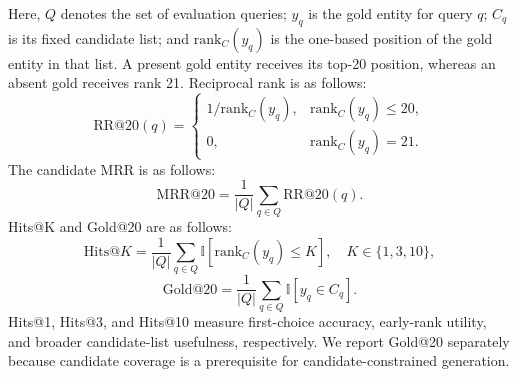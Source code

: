 \documentclass[pdflatex,sn-mathphys-num]{sn-jnl}
\begin{document}
Here, $Q$ denotes the set of evaluation queries; $y_q$ is the gold entity for query $q$; $C_q$ is its fixed candidate list; and $\mathrm{rank}_C(y_q)$ is the one-based position of the gold entity in that list. A present gold entity receives its top-20 position, whereas an absent gold receives rank 21. Reciprocal rank is  as follows:
\begin{equation}
\mathrm{RR@20}(q)=
\begin{cases}
1/\mathrm{rank}_C(y_q), & \mathrm{rank}_C(y_q)\leq20,\\
0, & \mathrm{rank}_C(y_q)=21.
\end{cases}
\label{eq:rr}
\end{equation}
The candidate MRR is  as follows:
\begin{equation}
\mathrm{MRR@20}=\frac{1}{|Q|}\sum_{q\in Q}\mathrm{RR@20}(q).
\label{eq:mrr}
\end{equation}
Hits@K and Gold@20 are  as follows:
\begin{equation}
\mathrm{Hits@}K =
\frac{1}{|Q|}
\sum_{q\in Q}
\mathbb{I}\left[\mathrm{rank}_C(y_q)\leq K\right],
\quad K\in\{1,3,10\},
\label{eq:hits}
\end{equation}
\begin{equation}
\mathrm{Gold@20}
=
\frac{1}{|Q|}
\sum_{q\in Q}
\mathbb{I}[y_q\in C_q].
\label{eq:gold}
\end{equation}
Hits@1, Hits@3, and Hits@10 measure first-choice accuracy, early-rank utility, and broader candidate-list usefulness, respectively. We report Gold@20 separately because candidate coverage is a prerequisite for candidate-constrained generation.
\end{document}
